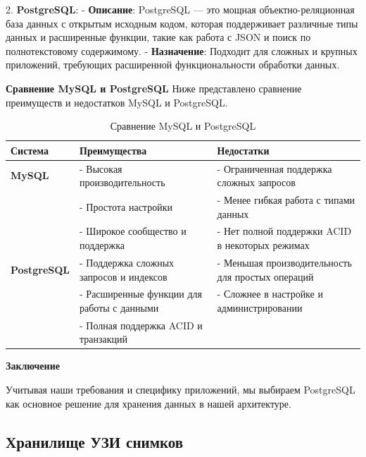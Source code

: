 2. \textbf{PostgreSQL}:
   - \textbf{Описание}: PostgreSQL — это мощная объектно-реляционная база данных с открытым исходным кодом, которая поддерживает различные типы данных и расширенные функции, такие как работа с JSON и поиск по полнотекстовому содержимому.
   - \textbf{Назначение}: Подходит для сложных и крупных приложений, требующих расширенной функциональности обработки данных.


\textbf{Сравнение MySQL и PostgreSQL}
Ниже представлено сравнение преимуществ и недостатков MySQL и PostgreSQL.

\begin{table}[h]
    \centering
    \begin{tabular}{|l|l|l|}
        \hline
        \textbf{Система}            & \textbf{Преимущества}                          & \textbf{Недостатки}                                \\ \hline
        \textbf{MySQL}              & - Высокая производительность                   & - Ограниченная поддержка сложных запросов       \\ \hline
                                   & - Простота настройки                           & - Менее гибкая работа с типами данных            \\ \hline
                                   & - Широкое сообщество и поддержка              & - Нет полной поддержки ACID в некоторых режимах  \\ \hline
        \textbf{PostgreSQL}        & - Поддержка сложных запросов и индексов       & - Меньшая производительность для простых операций   \\ \hline
                                   & - Расширенные функции для работы с данными    & - Сложнее в настройке и администрировании        \\ \hline
                                   & - Полная поддержка ACID и транзакций          &                                                  \\ \hline
    \end{tabular}
    \caption{Сравнение MySQL и PostgreSQL}
\end{table}

\textbf{Заключение}

Учитывая наши требования и специфику приложений, мы выбираем PostgreSQL как основное решение для хранения данных в нашей архитектуре.
\subsection{Хранилище УЗИ снимков}

